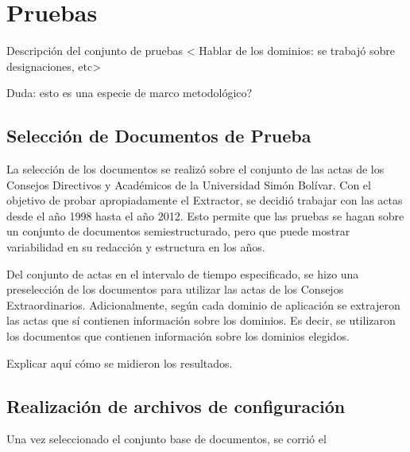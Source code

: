 \chapter{Pruebas} \label{chap:pruebas}

Descripción del conjunto de pruebas < Hablar de los dominios: se trabajó sobre designaciones, etc>

Duda: esto es una especie de marco metodológico?

\section{Selección de Documentos de Prueba}

La selección de los documentos se realizó sobre el conjunto de las actas de los Consejos Directivos y Académicos de la Universidad Simón Bolívar. Con el objetivo de probar apropiadamente el Extractor, se decidió trabajar con las actas desde el año 1998 hasta el año 2012. Esto permite que las pruebas se hagan sobre un conjunto de documentos semiestructurado, pero que puede mostrar variabilidad en su redacción y estructura en los años.

Del conjunto de actas en el intervalo de tiempo especificado, se hizo una preselección de los documentos para utilizar las actas de los Consejos Extraordinarios. Adicionalmente, según cada dominio de aplicación se extrajeron las actas que sí contienen información sobre los dominios. Es decir, se utilizaron los documentos que contienen información sobre los dominios elegidos.

Explicar aquí cómo se midieron los resultados.

\section{Realización de archivos de configuración}

Una vez seleccionado el conjunto base de documentos, se corrió el 